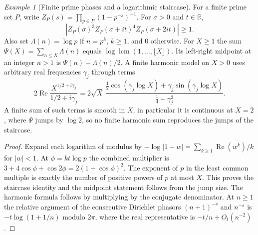 \documentclass[11pt,reqno]{amsart}
\theoremstyle{definition}
\theoremstyle{remark}
\newtheorem{example}[theorem]{Example}
\numberwithin{equation}{section}
\begin{document}
\begin{example}[Finite prime phases and a logarithmic staircase]\label{m8:staircase}
For a finite prime set $P$, write $Z_P(s)=\prod_{p\in P}(1-p^{-s})^{-1}$.
For $\sigma>0$ and $t\in\mathbb R$,
\[
 |Z_P(\sigma)^3Z_P(\sigma+it)^4Z_P(\sigma+2it)|\ge1.
\]
Also set $\Lambda(n)=\log p$ if $n=p^k$, $k\ge1$, and $0$
otherwise. For $X\ge1$ the sum
$\Psi(X)=\sum_{n\le X}\Lambda(n)$ equals
$\log\operatorname{lcm}(1,\ldots,\lfloor X\rfloor)$.
Its left-right midpoint at an integer $n>1$ is
$\Psi(n)-\Lambda(n)/2$. A finite harmonic model on $X>0$
uses arbitrary real frequencies $\gamma_j$ through terms
\[
 2\operatorname{Re}\frac{X^{1/2+i\gamma_j}}{1/2+i\gamma_j}
   =2\sqrt X\,
      \frac{\tfrac12\cos(\gamma_j\log X)+
                  \gamma_j\sin(\gamma_j\log X)}
           {\tfrac14+\gamma_j^2}.
\]
A finite sum of such terms is smooth in $X$; in particular it is continuous at $X=2$, where $\Psi$ jumps by $\log2$, so no finite
harmonic sum reproduces the jumps of the staircase.
\end{example}
\begin{proof}
Expand each logarithm of modulus by
$-\log|1-w|=\sum_{k\ge1}\operatorname{Re}(w^k)/k$ for $|w|<1$.
At $\phi=kt\log p$ the combined multiplier is
$3+4\cos\phi+\cos2\phi=2(1+\cos\phi)^2$.
The exponent of $p$ in the least common multiple is exactly
the number of positive powers of $p$ at most $X$. This proves
the staircase identity and the midpoint statement follows
from the jump size. The harmonic formula follows by
multiplying by the conjugate denominator. At $n\ge1$ the
relative argument of the consecutive Dirichlet phasors
$(n+1)^{-s}$ and $n^{-s}$ is $-t\log(1+1/n)$ modulo $2\pi$,
where the real representative is $-t/n+O_t(n^{-2})$.
\end{proof}
\end{document}
